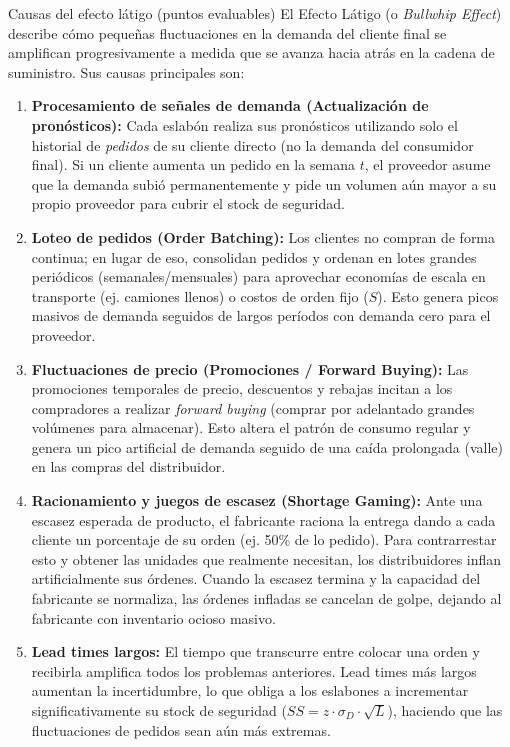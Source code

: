 \begin{definicion}{Causas del efecto látigo (puntos evaluables)}
El Efecto Látigo (o \textit{Bullwhip Effect}) describe cómo pequeñas fluctuaciones en la demanda del cliente final se amplifican progresivamente a medida que se avanza hacia atrás en la cadena de suministro. Sus causas principales son:
\begin{enumerate}[leftmargin=1.6em, itemsep=4pt, parsep=2pt]
  \item \textbf{Procesamiento de señales de demanda (Actualización de pronósticos):} Cada eslabón realiza sus pronósticos utilizando solo el historial de \textit{pedidos} de su cliente directo (no la demanda del consumidor final). Si un cliente aumenta un pedido en la semana $t$, el proveedor asume que la demanda subió permanentemente y pide un volumen aún mayor a su propio proveedor para cubrir el stock de seguridad.
  \item \textbf{Loteo de pedidos (Order Batching):} Los clientes no compran de forma continua; en lugar de eso, consolidan pedidos y ordenan en lotes grandes periódicos (semanales/mensuales) para aprovechar economías de escala en transporte (ej. camiones llenos) o costos de orden fijo ($S$). Esto genera picos masivos de demanda seguidos de largos períodos con demanda cero para el proveedor.
  \item \textbf{Fluctuaciones de precio (Promociones / Forward Buying):} Las promociones temporales de precio, descuentos y rebajas incitan a los compradores a realizar \textit{forward buying} (comprar por adelantado grandes volúmenes para almacenar). Esto altera el patrón de consumo regular y genera un pico artificial de demanda seguido de una caída prolongada (valle) en las compras del distribuidor.
  \item \textbf{Racionamiento y juegos de escasez (Shortage Gaming):} Ante una escasez esperada de producto, el fabricante raciona la entrega dando a cada cliente un porcentaje de su orden (ej. 50\% de lo pedido). Para contrarrestar esto y obtener las unidades que realmente necesitan, los distribuidores inflan artificialmente sus órdenes. Cuando la escasez termina y la capacidad del fabricante se normaliza, las órdenes infladas se cancelan de golpe, dejando al fabricante con inventario ocioso masivo.
  \item \textbf{Lead times largos:} El tiempo que transcurre entre colocar una orden y recibirla amplifica todos los problemas anteriores. Lead times más largos aumentan la incertidumbre, lo que obliga a los eslabones a incrementar significativamente su stock de seguridad ($SS = z \cdot \sigma_D \cdot \sqrt{L}$), haciendo que las fluctuaciones de pedidos sean aún más extremas.
\end{enumerate}


\end{definicion}
